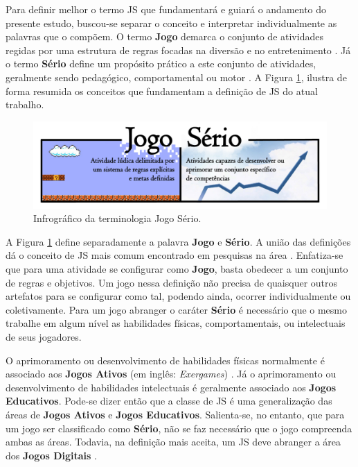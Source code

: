 Para definir melhor o termo \ac{JS} que fundamentará e guiará o andamento do presente estudo, buscou-se separar o conceito e interpretar individualmente as palavras que o compõem. O termo \textbf{Jogo} demarca o conjunto de atividades regidas por uma estrutura de regras focadas na diversão e no entretenimento \cite{kishimoto1994jogo}. Já o termo \textbf{Sério} define um propósito prático a este conjunto de atividades, geralmente sendo pedagógico, comportamental ou motor \cite{schroeder2017wobu, baptista2017jogos}. %
A Figura \ref{fig:JS}, ilustra de forma resumida os conceitos que fundamentam a definição de \ac{JS} do atual trabalho. 

\pagebreak

\begin{figure}[htb]

	\caption{\label{fig:JS}Infrográfico da terminologia Jogo Sério.}\vspace{-0.1cm}
  \hspace{-0.9cm}
  \includegraphics[width=1.1\linewidth]{./Visuais/JogoSerio.pdf}\vspace{-0.1cm}

\end{figure}

A Figura \ref{fig:JS} define separadamente a palavra \textbf{Jogo} e \textbf{Sério}. A união das definições dá o conceito de \ac{JS} mais comum encontrado em pesquisas na área \cite{michael2005serious}. Enfatiza-se que para uma atividade se configurar como \textbf{Jogo}, basta obedecer a um conjunto de regras e objetivos. Um jogo nessa definição não precisa de quaisquer outros artefatos para se configurar como tal, podendo ainda, ocorrer individualmente ou coletivamente. Para um jogo abranger o caráter \textbf{Sério} é necessário que o mesmo trabalhe em algum nível as habilidades físicas, comportamentais, ou intelectuais de seus jogadores. 

O aprimoramento ou desenvolvimento de habilidades físicas normalmente é associado aos \textbf{Jogos Ativos} (em inglês: \textit{Exergames}) \cite{araujo2017exergames, schroeder2017wobu}. Já o aprimoramento ou desenvolvimento de habilidades intelectuais é geralmente associado aos \textbf{Jogos Educativos}. Pode-se dizer então que a classe de \ac{JS} é uma generalização das áreas de \textbf{Jogos Ativos} e \textbf{Jogos Educativos}. Salienta-se, no entanto, que para um jogo ser classificado como \textbf{Sério}, não se faz necessário que o jogo compreenda ambas as áreas. Todavia, na definição mais aceita, um \ac{JS} deve abranger a área dos \textbf{Jogos Digitais} \cite{laamarti2014overview}.

